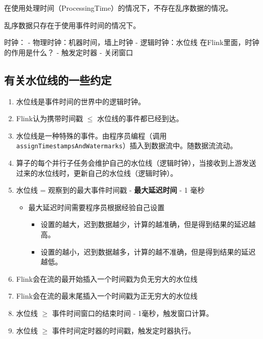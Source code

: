 在使用处理时间（ProcessingTime）的情况下，不存在乱序数据的情况。

乱序数据只存在于使用事件时间的情况下。

时钟： - 物理时钟：机器时间，墙上时钟 - 逻辑时钟：水位线
在Flink里面，时钟的作用是什么？ - 触发定时器 - 关闭窗口

\hypertarget{ux6709ux5173ux6c34ux4f4dux7ebfux7684ux4e00ux4e9bux7ea6ux5b9a}{%
\subsection{有关水位线的一些约定}\label{ux6709ux5173ux6c34ux4f4dux7ebfux7684ux4e00ux4e9bux7ea6ux5b9a}}

\begin{enumerate}
\def\labelenumi{\arabic{enumi}.}
\tightlist
\item
  水位线是事件时间的世界中的逻辑时钟。
\item
  Flink认为携带时间戳 \(\le\) 水位线的事件都已经到达。
\item
  水位线是一种{特殊的事件}。由程序员编程（调用\texttt{assignTimestampsAndWatermarks}）插入到数据流中。随数据流流动。
\item
  算子的每个并行子任务会维护自己的水位线（逻辑时钟），当接收到上游发送过来的水位线时，更新自己的水位线（逻辑时钟）。
\item
  水位线 = 观察到的最大事件时间戳 - \textbf{最大延迟时间} - 1 毫秒

  \begin{itemize}
  \tightlist
  \item
    最大延迟时间需要程序员根据经验自己设置

    \begin{itemize}
    \tightlist
    \item
      设置的越大，迟到数据越少，计算的越准确，但是得到结果的延迟越高。
    \item
      设置的越小，迟到数据越多，计算的越不准确，但是得到结果的延迟越低。
    \end{itemize}
  \end{itemize}
\item
  Flink会在流的最开始插入一个时间戳为负无穷大的水位线
\item
  Flink会在流的最末尾插入一个时间戳为正无穷大的水位线
\item
  水位线 \(\ge\) 事件时间窗口的结束时间 - 1毫秒，触发窗口计算。
\item
  水位线 \(\ge\) 事件时间定时器的时间戳，触发定时器执行。
\end{enumerate}

